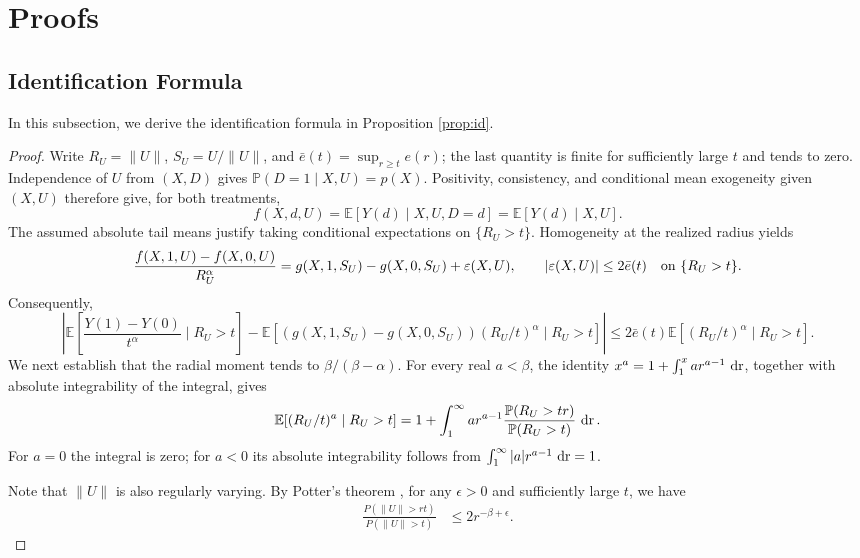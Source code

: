 \documentclass[12pt]{article}
\theoremstyle{plain}
\theoremstyle{definition}
\begin{document}
\newpage

\appendix
 

\section{Proofs}
\subsection{Identification Formula}
In this subsection, we derive the identification formula in Proposition
\ref{prop:id}.

\begin{proof}
Write $R_U=\|U\|$, $S_U=U/\|U\|$, and $\bar e(t)=\sup_{r\geq t}e(r)$; the last quantity is finite for sufficiently large $t$ and tends to zero. Independence of $U$ from $(X,D)$ gives $\mathbb P(D=1\mid X,U)=p(X)$. Positivity, consistency, and conditional mean exogeneity given $(X,U)$ therefore give, for both treatments, 
\[
f(X,d,U)=\mathbb E[Y(d)\mid X,U,D=d]=\mathbb E[Y(d)\mid X,U].
\]
 The assumed absolute tail means justify taking conditional expectations on $\{R_U>t\}$. Homogeneity at the realized radius yields 
\[
\frac{f(X,1,U)-f(X,0,U)}{R_U^{\alpha}}=g(X,1,S_U)-g(X,0,S_U)+\varepsilon(X,U),\qquad |\varepsilon(X,U)|\leq2\bar e(t)\quad\hbox{on }\{R_U>t\}.
\]
 Consequently, 
\[
\left|\mathbb E\left[\frac{Y(1)-Y(0)}{t^{\alpha}}\mid R_U>t\right]-\mathbb E\left[(g(X,1,S_U)-g(X,0,S_U))(R_U/t)^{\alpha}\mid R_U>t\right]\right|\leq2\bar e(t)\mathbb E[(R_U/t)^{\alpha}\mid R_U>t].
\]
 We next establish that the radial moment tends to $\beta/(\beta-\alpha)$. For every real $a<\beta$, the identity $x^a=1+\int_1^x a r^{a-1}\,\operatorname{dr}$, together with absolute integrability of the integral, gives 
\[
\mathbb E[(R_U/t)^a\mid R_U>t]=1+\int_1^{\infty}a r^{a-1}\frac{\mathbb P(R_U>tr)}{\mathbb P(R_U>t)}\,\operatorname{dr}.
\]
 For $a=0$ the integral is zero; for $a<0$ its absolute integrability follows from $\int_1^{\infty}|a|r^{a-1}\,\operatorname{dr}=1$.

Note that $\| U \|$ is also regularly varying. By Potter's theorem \cite[Theorem 1.56]{bingham1989regular}, for any $\epsilon >0$ and sufficiently large $t$, we have
\begin{align*}
  \frac{P (\| U \| > {rt})}{P (\| U \| > t)} & \leqslant 2 r^{-\beta + \epsilon} .
\end{align*}


\end{proof}
\end{document}
